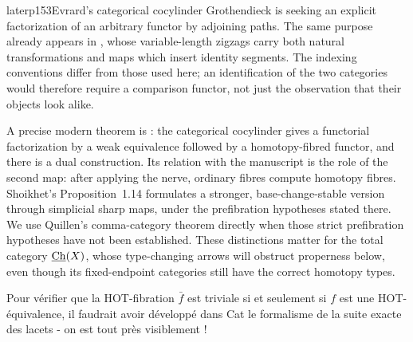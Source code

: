 \begin{dcomment}{later}{p153}{Evrard's categorical cocylinder}
Grothendieck is seeking an explicit factorization of an arbitrary functor by adjoining paths. The same purpose already appears in \citet[\S I.1]{Evrard1975}, whose variable-length zigzags carry both natural transformations and maps which insert identity segments. The indexing conventions differ from those used here; an identification of the two categories would therefore require a comparison functor, not just the observation that their objects look alike.

A precise modern theorem is \citet[Theorem~2.8]{Shoikhet2016}: the categorical cocylinder gives a functorial factorization by a weak equivalence followed by a homotopy-fibred functor, and there is a dual construction. Its relation with the manuscript is the role of the second map: after applying the nerve, ordinary fibres compute homotopy fibres. Shoikhet's Proposition~1.14 formulates a stronger, base-change-stable version through simplicial sharp maps, under the prefibration hypotheses stated there. We use Quillen's comma-category theorem directly when those strict prefibration hypotheses have not been established. These distinctions matter for the total category $\underline{\mathrm{Ch}}(X)$, whose type-changing arrows will obstruct properness below, even though its fixed-endpoint categories still have the correct homotopy types.
\end{dcomment}


Pour vérifier que la HOT-fibration $\bar f$ est triviale si et seulement si $f$ est une HOT-équivalence, il faudrait avoir développé dans Cat le formalisme de la suite exacte des lacets - on est tout près visiblement !


